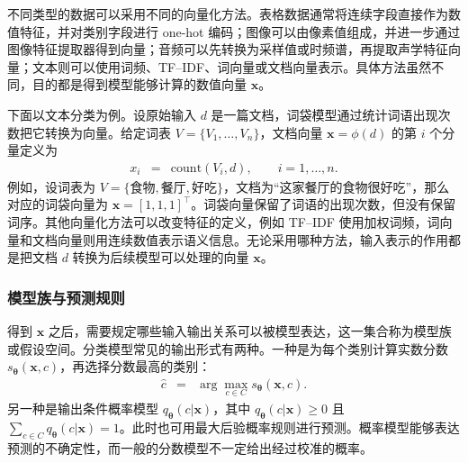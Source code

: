 不同类型的数据可以采用不同的向量化方法。表格数据通常将连续字段直接作为数值特征，并对类别字段进行 one-hot 编码；图像可以由像素值组成，并进一步通过图像特征提取器得到向量；音频可以先转换为采样值或时频谱，再提取声学特征向量；文本则可以使用词频、TF--IDF、词向量或文档向量表示。具体方法虽然不同，目的都是得到模型能够计算的数值向量 $\mathbf{x}$。

下面以文本分类为例。设原始输入 $d$ 是一篇文档，词袋模型通过统计词语出现次数把它转换为向量。给定词表 $V=\{V_1,\ldots,V_n\}$，文档向量 $\mathbf{x}=\phi(d)$ 的第 $i$ 个分量定义为
\begin{eqnarray}
x_i & = & \mathrm{count}(V_i,d),
\qquad i=1,\ldots,n.
\end{eqnarray}
例如，设词表为 $V=\{\text{食物},\text{餐厅},\text{好吃}\}$，文档为“这家餐厅的食物很好吃”，那么对应的词袋向量为 $\mathbf{x}=[1,1,1]^{\top}$。词袋向量保留了词语的出现次数，但没有保留词序。其他向量化方法可以改变特征的定义，例如 TF--IDF 使用加权词频，词向量和文档向量则用连续数值表示语义信息。无论采用哪种方法，输入表示的作用都是把文档 $d$ 转换为后续模型可以处理的向量 $\mathbf{x}$。

\subsubsection{模型族与预测规则}

得到 $\mathbf{x}$ 之后，需要规定哪些输入输出关系可以被模型表达，这一集合称为模型族或假设空间。分类模型常见的输出形式有两种。一种是为每个类别计算实数分数 $s_{\boldsymbol{\theta}}(\mathbf{x},c)$，再选择分数最高的类别：
\begin{eqnarray}
\hat{c}
& = &
\arg\max_{c\in C}s_{\boldsymbol{\theta}}(\mathbf{x},c).
\label{eq:sec12-classification-prediction}
\end{eqnarray}
另一种是输出条件概率模型 $q_{\boldsymbol{\theta}}(c|\mathbf{x})$，其中 $q_{\boldsymbol{\theta}}(c|\mathbf{x})\geq 0$ 且 $\sum_{c\in C}q_{\boldsymbol{\theta}}(c|\mathbf{x})=1$。此时也可用最大后验概率规则进行预测。概率模型能够表达预测的不确定性，而一般的分数模型不一定给出经过校准的概率。

